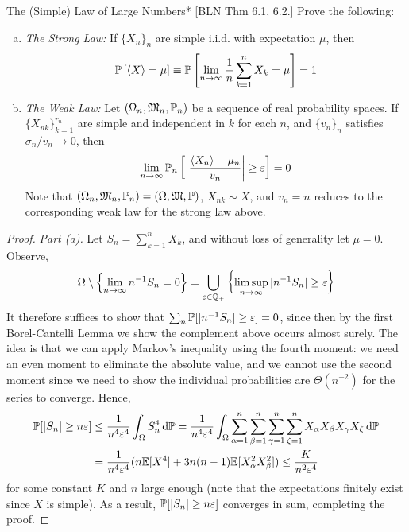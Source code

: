 \begin{problem}{The (Simple) Law of Large Numbers}*
    [BLN Thm 6.1, 6.2.] Prove the following:
    \begin{enumerate}[(a)]
        \itemsep0em
        \item \emph{The Strong Law:} If \(\{X_n\}_n\) are simple i.i.d. with expectation \(\mu\), then
        \[
            \bb{P}\left[\ev{X} = \mu\right]
            \equiv \bb{P}\left[ \lim_{n \to \infty} \frac{1}{n} \sum_{k=1}^n X_k = \mu \right]
            = 1
        \]
        \item \emph{The Weak Law:} Let \((\Omega_n, \mathfrak{M}_n, \mathbb{P}_n)\) be a sequence of real probability spaces. If \(\{X_{nk}\}_{k=1}^{r_n}\) are simple and independent in \(k\) for each \(n\), and \(\{v_n\}_n\) satisfies \(\sigma_n / v_n \to 0\), then
        \[
            \lim_{n \to \infty} \bb{P}_n \left[ \left| \frac{\ev{X_n} - \mu_n}{v_n} \right| \geq \varepsilon \right] = 0
        \]
        Note that \((\Omega_n, \mathfrak{M}_n, \mathbb{P}_n) = (\Omega, \mathfrak{M}, \mathbb{P})\), \(X_{nk} \sim X\), and \(v_n = n\) reduces to the corresponding weak law for the strong law above. 
    \end{enumerate}
\end{problem}

\begin{proof}
    \emph{Part (a).} Let \(S_n = \sum_{k=1}^n X_k\), and without loss of generality let \(\mu = 0\). Observe, 
    \[
        \Omega \setminus \left\{\lim_{n \to \infty} n^{-1} S_n = 0\right\} 
        = \bigcup_{\varepsilon \in \mathbb{Q}_+} \left\{\limsup_{n \to \infty} |n^{-1} S_n| \geq \varepsilon \right\}
    \]
    It therefore suffices to show that \(\sum_n \mathbb{P}[|n^{-1} S_n| \geq \varepsilon] = 0\), since then by the first Borel-Cantelli Lemma we show the complement above occurs almost surely. The idea is that we can apply Markov's inequality using the fourth moment: we need an even moment to eliminate the absolute value, and we cannot use the second moment since we need to show the individual probabilities are \(\Theta(n^{-2})\) for the series to converge. Hence,
    \begin{align*}
        \mathbb{P}[|S_n| \geq n \varepsilon]
        &\leq \frac{1}{n^4 \varepsilon^4} \int_{\Omega} S_n^4 \, \mathrm{d}\mathbb{P} 
        = \frac{1}{n^4 \varepsilon^4} \int_{\Omega} \sum_{\alpha=1}^n \sum_{\beta=1}^n \sum_{\gamma=1}^n \sum_{\zeta=1}^n X_\alpha X_\beta X_\gamma X_\zeta \, \mathrm{d}\mathbb{P} \\
        &= \frac{1}{n^4 \varepsilon^4} (n \mathbb{E}[X^4] + 3n(n-1) \mathbb{E}[X_\alpha^2 X_\beta^2])
        \leq \frac{K}{n^2 \varepsilon^4}
    \end{align*}
    for some constant \(K\) and \(n\) large enough (note that the expectations finitely exist since \(X\) is simple). As a result, \(\mathbb{P}[|S_n| \geq n \varepsilon]\) converges in sum, completing the proof. 
\end{proof}

